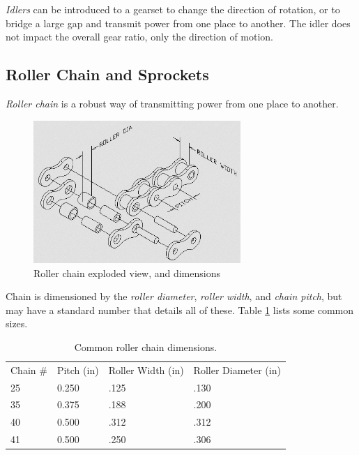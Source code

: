 \documentclass[10pt,letterpaper]{book}
\begin{document}
\textit{Idlers} can be introduced to a gearset to change the direction of rotation, or to bridge a large gap and transmit power from one place to another. The idler does not impact the overall gear ratio, only the direction of motion.



\newpage

\subsection{Roller Chain and Sprockets}

\textit{Roller chain} is a robust way of transmitting power from one place to another. 

\begin{figure}[H]
	\includegraphics[width=0.7\textwidth]{imgs/rollerchain_nomenclature.png}
	\caption{Roller chain exploded view, and dimensions}
\end{figure}

Chain is dimensioned by the \textit{roller diameter}, \textit{roller width}, and \textit{chain pitch}, but may have a standard number that details all of these. Table \ref{table:chaindims} lists some common sizes.

\begin{table}[H] \label{table:chaindims}
\begin{tabular}{llll}
Chain \# & Pitch (in) & Roller Width (in) & Roller Diameter (in) \\
25       & 0.250      & .125              & .130                 \\
35       & 0.375      & .188              & .200                 \\
40       & 0.500      & .312              & .312                 \\
41       & 0.500      & .250              & .306                
\end{tabular}
\caption{Common roller chain dimensions.}
\end{table}
\end{document}
